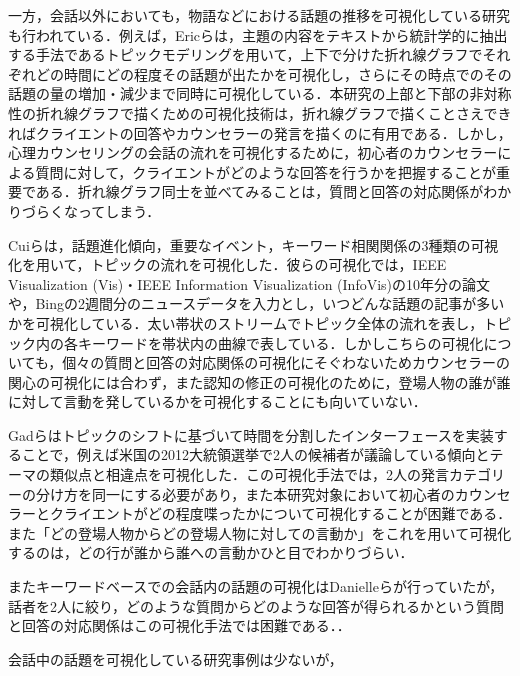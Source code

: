 \documentclass[shuuron]{kuee}
\begin{document}
一方，会話以外においても，物語などにおける話題の推移を可視化している研究も行われている．例えば，Ericら\cite{taskdriven}は，主題の内容をテキストから統計学的に抽出する手法であるトピックモデリングを用いて，上下で分けた折れ線グラフでそれぞれどの時間にどの程度その話題が出たかを可視化し，さらにその時点でのその話題の量の増加・減少まで同時に可視化している．本研究の上部と下部の非対称性の折れ線グラフで描くための可視化技術は，折れ線グラフで描くことさえできればクライエントの回答やカウンセラーの発言を描くのに有用である．しかし，心理カウンセリングの会話の流れを可視化するために，初心者のカウンセラーによる質問に対して，クライエントがどのような回答を行うかを把握することが重要である．折れ線グラフ同士を並べてみることは，質問と回答の対応関係がわかりづらくなってしまう．

Cuiら\cite{cui2011textflow}は，話題進化傾向，重要なイベント，キーワード相関関係の3種類の可視化を用いて，トピックの流れを可視化した．彼らの可視化では，IEEE Visualization (Vis)・IEEE Information Visualization (InfoVis)の10年分の論文や，Bingの2週間分のニュースデータを入力とし，いつどんな話題の記事が多いかを可視化している．太い帯状のストリームでトピック全体の流れを表し，トピック内の各キーワードを帯状内の曲線で表している．しかしこちらの可視化についても，個々の質問と回答の対応関係の可視化にそぐわないためカウンセラーの関心の可視化には合わず，また認知の修正の可視化のために，登場人物の誰が誰に対して言動を発しているかを可視化することにも向いていない．

Gadら\cite{gad2015themedelta}はトピックのシフトに基づいて時間を分割したインターフェースを実装することで，例えば米国の2012大統領選挙で2人の候補者が議論している傾向とテーマの類似点と相違点を可視化した．この可視化手法では，2人の発言カテゴリーの分け方を同一にする必要があり，また本研究対象において初心者のカウンセラーとクライエントがどの程度喋ったかについて可視化することが困難である．また「どの登場人物からどの登場人物に対しての言動か」をこれを用いて可視化するのは，どの行が誰から誰への言動かひと目でわかりづらい．

またキーワードベースでの会話内の話題の可視化はDanielleら\cite{angus2012conceptual}が行っていたが，話者を2人に絞り，どのような質問からどのような回答が得られるかという質問と回答の対応関係はこの可視化手法では困難である．．%

会話中の話題を可視化している研究事例は少ないが，
\end{document}
